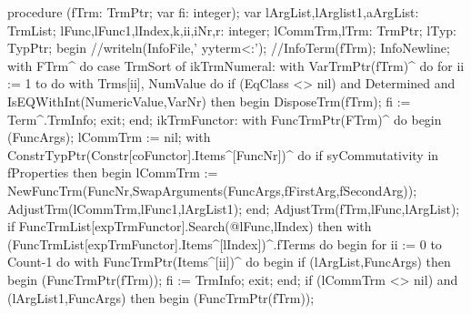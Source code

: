 \nwenddocs{}\endmoddef\nwstartdeflinemarkup{}\nwenddeflinemarkup
procedure (fTrm: TrmPtr; var fi: integer);
var
   lArgList,lArglist1,aArgList: TrmList;
   lFunc,lFunc1,lIndex,k,ii,iNr,r: integer;
   lCommTrm,lTrm: TrmPtr;
   lTyp: TypPtr;
begin
   //writeln(InfoFile,' yyterm<:');
   //InfoTerm(fTrm); InfoNewline;
   with FTrm^ do
      case TrmSort of
        ikTrmNumeral:
           with VarTrmPtr(fTrm)^ do
              for ii := 1 to  do
                 with Trms[ii], NumValue do
                    if (EqClass <> nil) and Determined and
                       IsEQWithInt(NumericValue,VarNr) then
                    begin
                       DisposeTrm(fTrm);
                       fi := Term^.TrmInfo;
                       exit;
                    end;
        ikTrmFunctor:
           with FuncTrmPtr(FTrm)^ do
           begin
              (FuncArgs);
              lCommTrm := nil;
              with ConstrTypPtr(Constr[coFunctor].Items^[FuncNr])^ do
                 if syCommutativity in fProperties then
                 begin
                    lCommTrm := NewFuncTrm(FuncNr,SwapArguments(FuncArgs,fFirstArg,fSecondArg));
                    AdjustTrm(lCommTrm,lFunc1,lArgList1);
                 end;
              AdjustTrm(fTrm,lFunc,lArgList);
              if FuncTrmList[expTrmFunctor].Search(@lFunc,lIndex) then
                 with (FuncTrmList[expTrmFunctor].Items^[lIndex])^.fTerms do
                 begin
                    for ii := 0 to Count-1 do
                       with FuncTrmPtr(Items^[ii])^ do
                       begin
                          if (lArgList,FuncArgs) then
                          begin
                             (FuncTrmPtr(fTrm));
                             fi := TrmInfo;
                             exit;
                          end;
                          if (lCommTrm <> nil) and (lArgList1,FuncArgs) then
                          begin
                             (FuncTrmPtr(fTrm));
